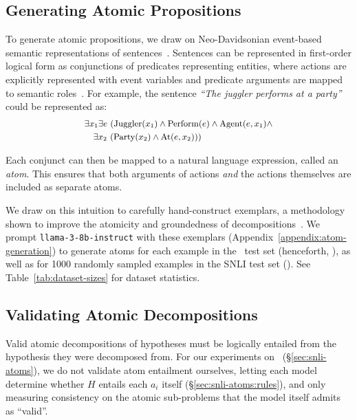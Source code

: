 \subsection{Generating Atomic Propositions}
\label{subsec:generate-atoms}
To generate atomic propositions, we draw on Neo-Davidsonian event-based semantic representations of sentences~\cite{castaneda1967, parsons1990events}.
%
Sentences can be represented in first-order logical form as conjunctions of predicates representing entities, where actions are explicitly represented with event variables and predicate arguments are mapped to semantic roles~\cite{dowty1991thematic}. 
%
For example, the sentence \textit{``The juggler performs at a party''} could be represented as: 
\[
\small
\begin{aligned}
    &\exists x_1 \exists e \ (\text{Juggler}(x_1) \land \text{Perform}(e) \land \text{Agent}(e, x_1) \land \\
    &\quad \exists x_2 \ (\text{Party}(x_2) \land \text{At}(e, x_2)))
\end{aligned}
\]

\noindent Each conjunct can then be mapped to a natural language expression, called an \textit{atom}.
%
This ensures that both arguments of actions \textit{and} the actions themselves are included as separate atoms.

We draw on this intuition to carefully hand-construct exemplars, a methodology shown to improve the atomicity and groundedness of decompositions~\cite{wanner2024closer}.
%
We prompt \texttt{llama-3-8b-instruct} with these exemplars (Appendix~\ref{appendix:atom-generation}) to generate atoms for each example in the \dsnli~test set (henceforth, \dsnlitest),  as well as for 1000 randomly sampled examples in the SNLI test set (\snlitest). See Table~\ref{tab:dataset-sizes} for dataset statistics.

\subsection{Validating Atomic Decompositions}
\label{subsec:validate-atoms}
Valid atomic decompositions of hypotheses must be logically entailed from the hypothesis they were decomposed from.
%
For our experiments on \snlitest~(\S\ref{sec:snli-atoms}), we do not validate atom entailment ourselves, letting each model determine whether $H$ entails each $a_i$ itself (\S\ref{sec:snli-atoms:rules}), and only measuring consistency on the atomic sub-problems that the model itself admits as ``valid''.
%


